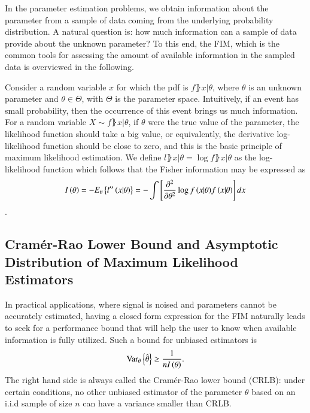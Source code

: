 In the parameter estimation problems, we obtain information about the parameter from a sample of data coming from the underlying probability distribution. 
A natural question is: how much information can a sample of data provide about the unknown parameter? 
To this end, the FIM, which is the common tools for assessing the amount of available information in the sampled data is overviewed in the following.
\par
Consider a random variable $x$ for which the pdf is $f\rBrace{x|\theta}$, where $\theta$ is an unknown parameter and $\theta\in\Theta$, with $\Theta$ is the parameter space.
Intuitively, if an event has small probability, then the occurrence of this event brings us much information.
For a random variable $X \sim f\rBrace{x|\theta}$, if $\theta$ were the true value of the parameter, the likelihood function should take a big value, or equivalently, the derivative log-likelihood function should be close to zero, and this is the basic principle of maximum likelihood estimation.
We define $l\rBrace{x|\theta} = \log{f\rBrace{x|\theta}}$ as the log-likelihood function which follows that the Fisher information may be expressed \cite{van2004detection} as 
\begin{equation}
\label{eq_prlm_Ifin}
    I\left({\theta}\right) = -E_{\theta}\left\{{l^{\prime\prime}\left({x|\theta}\right)}\right\}=-\int{\left[{\frac{\partial^{2}}{\partial\theta^{2}}\log{f\left({x|\theta}\right)}f\left({x|\theta}\right)}\right]dx}
\end{equation}.
\subsection{Cram\'er-Rao Lower Bound and Asymptotic Distribution of Maximum Likelihood Estimators}
In practical applications, where signal is noised and parameters cannot be accurately estimated, having a closed form expression for the FIM naturally leads to seek for a performance bound that will help the user to know when available information is fully utilized.
Such a bound for unbiased estimators is \cite{van2004detection}
\begin{equation*}
    \text{Var}_{\theta}\left\{{\hat{\theta}}\right\}\geq\frac{1}{nI\left({\theta}\right)}.
\end{equation*}
The right hand side is always called the Cram\'er-Rao lower bound (CRLB): under certain conditions, no other unbiased estimator of the parameter $\theta$ based on an i.i.d sample of size $n$ can have a variance smaller than CRLB.
